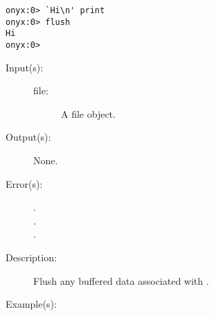\begin{description}
\begin{description}
\begin{verbatim}
onyx:0> `Hi\n' print
onyx:0> flush
Hi
onyx:0>
		\end{verbatim}
	\end{description}
\label{systemdict:flushfile}
\item[{\onyxop{file}{flushfile}{--}}: ]
	\begin{description}\item[]
	\item[Input(s): ]
		\begin{description}\item[]
		\item[file: ]
			A file object.
		\end{description}
	\item[Output(s): ] None.
	\item[Error(s): ]
		\begin{description}\item[]
		\item[.]
		\item[.]
		\item[.]
		\end{description}
	\item[Description: ]
		Flush any buffered data associated with .
	\item[Example(s): ]\begin{verbatim}


\end{verbatim}
\end{description}
\end{description}
